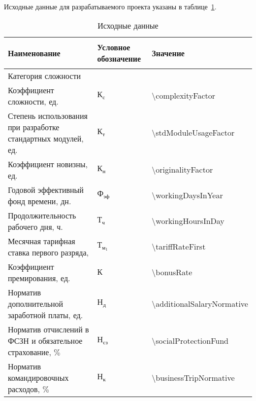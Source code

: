 Исходные данные для разрабатываемого проекта указаны в таблице~\ref{table:econ:initial_data}.

\begin{table}[!ht]
\caption{Исходные данные}
\label{table:econ:initial_data}
  \centering
  \begin{tabular}{| >{\raggedright}m{}
                  | >{\centering}m{}
                  | >{\centering\arraybackslash}m{}|}
    \hline
    {\begin{center}
      Наименование
    \end{center} } & Условное обозначение & Значение \\
    \hline
    Категория сложности & & 2 \\

    \hline
    Коэффициент сложности, ед. & $ \text{К}_\text{с} $ & \num{\complexityFactor} \\

    \hline
    Степень использования при разработке стандартных модулей, ед. & $ \text{К}_\text{т} $ & \num{\stdModuleUsageFactor} \\

    \hline
    Коэффициент новизны, ед. & $ \text{К}_\text{н} $ & \num{\originalityFactor} \\

    \hline
    Годовой эффективный фонд времени, дн. & $ \text{Ф}_\text{эф} $ & \num{\workingDaysInYear} \\

    \hline
    Продолжительность рабочего дня, ч. & $ \text{Т}_\text{ч} $ & \num{\workingHoursInDay} \\

    \hline
    Месячная тарифная ставка первого разряда, \byr{} & $ \text{Т}_{\text{м}_{1}}$ & \num{\tariffRateFirst} \\

    \hline
    Коэффициент премирования, ед. & $ \text{К} $ & \num{\bonusRate} \\

    \hline
    Норматив дополнительной заработной платы, ед. & $ \text{Н}_\text{д} $ & \num{\additionalSalaryNormative} \\

    \hline
    Норматив отчислений в ФСЗН и обязательное страхование, $\%$ & $ \text{Н}_\text{сз} $ & \num{\socialProtectionFund} \\

    \hline
    Норматив командировочных расходов, $\%$ & $ \text{Н}_\text{к} $ & \num{\businessTripNormative} \\


\end{tabular}
\end{table}
